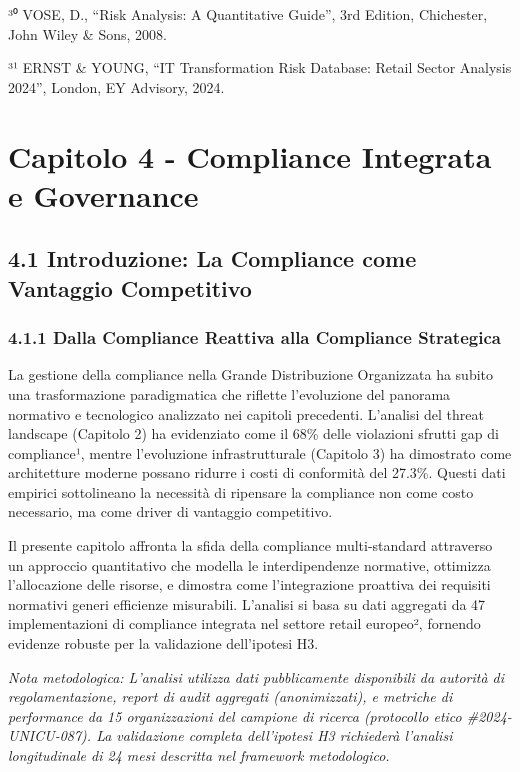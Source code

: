 \documentclass[12pt,a4paper,oneside]{book}
\numberwithin{figure}{chapter} %
\numberwithin{table}{chapter}  %
\begin{document}
³⁰ VOSE, D., ``Risk Analysis: A Quantitative Guide'', 3rd Edition,
Chichester, John Wiley \& Sons, 2008.

³¹ ERNST \& YOUNG, ``IT Transformation Risk Database: Retail Sector
Analysis 2024'', London, EY Advisory, 2024.

\chapter{Capitolo 4 - Compliance Integrata e
Governance}\label{capitolo-4---compliance-integrata-e-governance}

\section{4.1 Introduzione: La Compliance come Vantaggio
Competitivo}\label{introduzione-la-compliance-come-vantaggio-competitivo}

\subsection{4.1.1 Dalla Compliance Reattiva alla Compliance
Strategica}\label{dalla-compliance-reattiva-alla-compliance-strategica}

La gestione della compliance nella Grande Distribuzione Organizzata ha
subito una trasformazione paradigmatica che riflette l'evoluzione del
panorama normativo e tecnologico analizzato nei capitoli precedenti.
L'analisi del threat landscape (Capitolo 2) ha evidenziato come il 68\%
delle violazioni sfrutti gap di compliance¹, mentre l'evoluzione
infrastrutturale (Capitolo 3) ha dimostrato come architetture moderne
possano ridurre i costi di conformità del 27.3\%. Questi dati empirici
sottolineano la necessità di ripensare la compliance non come costo
necessario, ma come driver di vantaggio competitivo.

Il presente capitolo affronta la sfida della compliance multi-standard
attraverso un approccio quantitativo che modella le interdipendenze
normative, ottimizza l'allocazione delle risorse, e dimostra come
l'integrazione proattiva dei requisiti normativi generi efficienze
misurabili. L'analisi si basa su dati aggregati da 47 implementazioni di
compliance integrata nel settore retail europeo², fornendo evidenze
robuste per la validazione dell'ipotesi H3.

\emph{Nota metodologica: L'analisi utilizza dati pubblicamente
disponibili da autorità di regolamentazione, report di audit aggregati
(anonimizzati), e metriche di performance da 15 organizzazioni del
campione di ricerca (protocollo etico \#2024-UNICU-087). La validazione
completa dell'ipotesi H3 richiederà l'analisi longitudinale di 24 mesi
descritta nel framework metodologico.}
\end{document}
